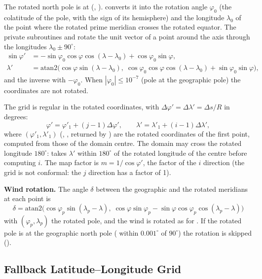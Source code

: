 The rotated north pole is at (, ). 
converts it into the rotation angle $\varphi_0$ (the colatitude of the
pole, with the sign of its hemisphere) and the longitude $\lambda_0$ of the
point where the rotated prime meridian crosses the rotated equator. The
private subroutines  and 
rotate the unit vector of a point around the axis through the longitudes
$\lambda_0 \pm 90^\circ$:
\[
  \begin{aligned}
    \sin\varphi' &= -\sin\varphi_0\cos\varphi\cos(\lambda-\lambda_0)
                    + \cos\varphi_0\sin\varphi, \\
    \lambda' &= \text{atan2}\bigl(\cos\varphi\sin(\lambda-\lambda_0),\;
                \cos\varphi_0\cos\varphi\cos(\lambda-\lambda_0)
                + \sin\varphi_0\sin\varphi\bigr),
  \end{aligned}
\]
and the inverse with $-\varphi_0$. When $|\varphi_0| \le 10^{-7}$ (pole at
the geographic pole) the coordinates are not rotated.

The grid is regular in the rotated coordinates, with
$\Delta\varphi' = \Delta\lambda' = \Delta s/R$ in degrees:
\[
  \varphi' = \varphi'_1 + (j-1)\Delta\varphi', \qquad
  \lambda' = \lambda'_1 + (i-1)\Delta\lambda',
\]
where $(\varphi'_1, \lambda'_1)$ (, , returned by
) are the rotated coordinates of the first point, computed from
those of the domain centre. The domain may cross the rotated longitude
$180^\circ$:  takes $\lambda'$ within $180^\circ$ of the
rotated longitude of the centre before computing $i$. The map factor is
$m = 1/\cos\varphi'$, the factor of the $i$ direction (the grid is not
conformal: the $j$ direction has a factor of 1).

\textbf{Wind rotation.} The angle $\delta$ between the geographic and the
rotated meridians at each point is
\[
  \delta = \text{atan2}\bigl(\cos\varphi_p\sin(\lambda_p - \lambda),\;
           \cos\varphi\sin\varphi_p -
           \sin\varphi\cos\varphi_p\cos(\lambda_p - \lambda)\bigr)
\]
with $(\varphi_p, \lambda_p)$ the rotated pole, and the wind is rotated as
for . If the rotated pole is at the geographic north pole
( within $0.001^\circ$ of $90^\circ$) the rotation is skipped
().

\subsection{Fallback Latitude--Longitude Grid}
\label{subsec:proj_ll}

